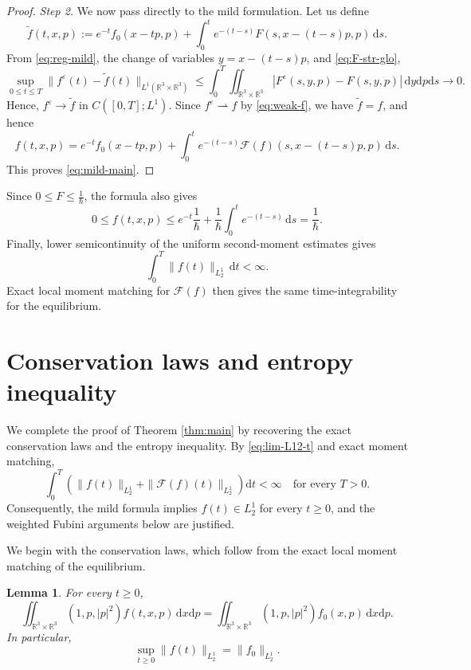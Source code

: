 \documentclass[10pt,reqno]{amsart}
\numberwithin{equation}{section}
\newtheorem{lemma}{Lemma}[section]
\theoremstyle{definition}
\newcommand{\R}{\mathbb R}
\newcommand{\dx}{\mathrm{d}x}
\newcommand{\dpp}{\mathrm{d}p}
\newcommand{\dt}{\mathrm{d}t}
\newcommand{\ds}{\mathrm{d}s}
\newcommand{\dy}{\mathrm{d}y}
\newcommand{\e}{\varepsilon}
\newcommand{\calF}{\mathcal F}
\newcommand{\bq}{\begin{equation}}
\newcommand{\eq}{\end{equation}}
\newcommand{\lt}{\left}
\newcommand{\rt}{\right}
\begin{document}
\begin{proof}
\textit{Step 2.} We now pass directly to the mild formulation. Let us define
\[
 \widetilde f(t,x,p) :=e^{-t}f_0(x-tp,p) +\int_0^te^{-(t-s)}F(s,x-(t-s)p,p)\,\ds.
\]
From \eqref{eq:reg-mild}, the change of variables $y=x-(t-s)p$, and \eqref{eq:F-str-glo},
\[
 \sup_{0\leq t\leq T}  \|f^\e(t)-\widetilde f(t)\|_{L^1(\R^3\times\R^3)} \leq\int_0^T\iint_{\R^3\times\R^3}  |F^\e(s,y,p)-F(s,y,p)|\,\dy\dpp\ds \to0.
\]
Hence, $f^\e\to\widetilde f$ in $C([0,T];L^1)$.  Since $f^\e\rightharpoonup f$ by \eqref{eq:weak-f}, we have $\widetilde f=f$, and hence
\[
 f(t,x,p)  =e^{-t}f_0(x-tp,p)  +\int_0^te^{-(t-s)}\calF(f)(s,x-(t-s)p,p)\,\ds.
\]
This proves \eqref{eq:mild-main}. 
\end{proof}


Since $0\leq F\leq\frac1\hbar $, the formula also gives
\[
 0\leq f(t,x,p)  \leq e^{-t}\frac1\hbar   +\frac1\hbar \int_0^te^{-(t-s)}\,\ds  =\frac1\hbar .
\]
Finally, lower semicontinuity of the uniform second-moment estimates gives
\bq \label{eq:lim-L12-t}
 \int_0^T\|f(t)\|_{L^1_2}\,\dt<\infty.
\eq
Exact local moment matching for $\calF(f)$ then gives the same time-integrability for the equilibrium.  



%
%
%
%
%
%

\section{Conservation laws and entropy inequality}\label{sec:H-thm}

We complete the proof of Theorem \ref{thm:main} by recovering the exact conservation laws and the entropy inequality.  By \eqref{eq:lim-L12-t} and exact moment matching,
\[
 \int_0^T\lt(\|f(t)\|_{L^1_2}+\|\calF(f)(t)\|_{L^1_2}\rt) \dt<\infty  \quad\text{for every }T>0.
\]
Consequently, the mild formula implies $f(t)\in L^1_2$ for every $t\geq0$, and the weighted Fubini arguments below are justified.

We begin with the conservation laws, which follow from the exact local moment matching of the equilibrium.


\begin{lemma}\label{lem:conserv}
For every $t\geq0$,
\[%
 \iint_{\R^3\times\R^3}(1,p,|p|^2)f(t,x,p)\,\dx\dpp  =\iint_{\R^3\times\R^3}(1,p,|p|^2)f_0(x,p)\,\dx\dpp.
\]%
In particular,
\[%
 \sup_{t\geq0}\|f(t)\|_{L^1_2}=\|f_0\|_{L^1_2}.
\]%
\end{lemma}
\end{document}
